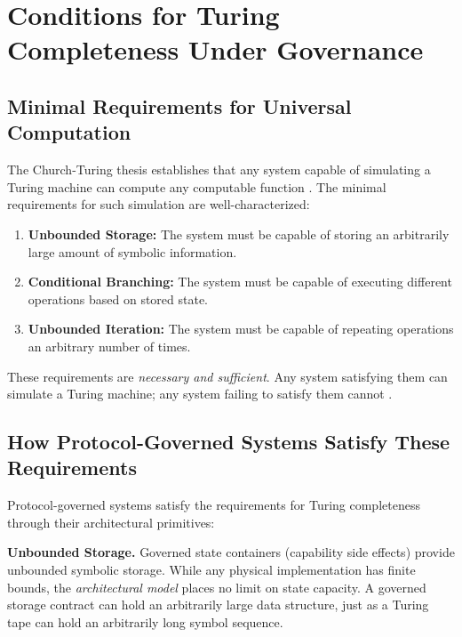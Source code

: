 \documentclass[11pt,a4paper]{article}
\begin{document}

\section{Conditions for Turing Completeness Under Governance}
\label{sec:conditions}

\subsection{Minimal Requirements for Universal Computation}

The Church-Turing thesis establishes that any system capable of simulating a Turing machine can compute any computable function \citep{sipser2012introduction}. The minimal requirements for such simulation are well-characterized:

\begin{enumerate}[nosep]
    \item \textbf{Unbounded Storage:} The system must be capable of storing an arbitrarily large amount of symbolic information.
    \item \textbf{Conditional Branching:} The system must be capable of executing different operations based on stored state.
    \item \textbf{Unbounded Iteration:} The system must be capable of repeating operations an arbitrary number of times.
\end{enumerate}

These requirements are \emph{necessary and sufficient}. Any system satisfying them can simulate a Turing machine; any system failing to satisfy them cannot \citep{hopcroft2006automata}.

\subsection{How Protocol-Governed Systems Satisfy These Requirements}

Protocol-governed systems satisfy the requirements for Turing completeness through their architectural primitives:

\textbf{Unbounded Storage.} Governed state containers (capability side effects) provide unbounded symbolic storage. While any physical implementation has finite bounds, the \emph{architectural model} places no limit on state capacity. A governed storage contract can hold an arbitrarily large data structure, just as a Turing tape can hold an arbitrarily long symbol sequence.
\end{document}
